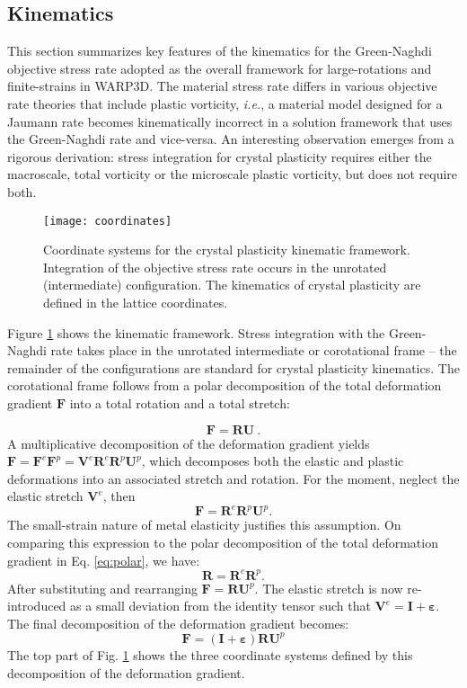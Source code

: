 \documentclass[11pt]{report}
\numberwithin{equation}{section}
\newcommand{\ie}{\emph{i.e.},\xspace}
\begin{document}
\subsection{Kinematics}

This section summarizes key features of the kinematics for
the Green-Naghdi objective stress rate adopted as the overall framework 
for large-rotations and finite-strains in WARP3D. The material
stress rate differs in various  objective rate theories
that include plastic vorticity, \ie a material model designed for a
Jaumann rate becomes kinematically incorrect in a solution framework
that uses the Green-Naghdi rate and vice-versa. An interesting observation
emerges from a rigorous derivation: stress integration for crystal plasticity
requires either the macroscale, total vorticity or the microscale
plastic vorticity, but does not require both.

\begin{figure}
\begin{centering}
\texttt{[image: coordinates]}
\par\end{centering}

\caption{
\small 
Coordinate systems for the crystal plasticity kinematic framework.
Integration of the objective stress rate occurs in the unrotated (intermediate)
configuration. The kinematics of crystal plasticity are defined in
the lattice coordinates. \label{fig:coords}
\normalsize}
\end{figure}


Figure \ref{fig:coords} shows the kinematic framework. Stress integration
with the Green-Naghdi rate takes place in the unrotated intermediate
or corotational frame -- the remainder of the configurations are standard
for crystal plasticity kinematics. The corotational frame
follows from a polar decomposition of the total deformation gradient
$\mathbf{F}$ into a total rotation and a total stretch:

\begin{equation}
\mathbf{F}=\mathbf{R}\mathbf{U}\ .\label{eq:polar}
\end{equation}
A multiplicative decomposition of the deformation gradient yields
$\ensuremath{\mathbf{F}=\mathbf{F}^{e}\mathbf{F}^{p}=\mathbf{V}^{e}
\mathbf{R}^{e}\mathbf{R}^{p}\mathbf{U}^{p}}$,
which decomposes both the elastic and plastic deformations into an
associated stretch and rotation. For the moment, neglect the elastic
stretch $\mathbf{V}^{e}$, then
\[
\ensuremath{\mathbf{F}=\mathbf{R}^{e}\mathbf{R}^{p}\mathbf{U}^{p}.}
\]
The small-strain nature of metal elasticity justifies this assumption.
On comparing this expression to the polar decomposition of the total
deformation gradient in Eq. \ref{eq:polar}, we have:
\[
\mathbf{R}=\mathbf{R}^{e}\mathbf{R}^{p}.
\]
After substituting and rearranging $\mathbf{F}=\mathbf{R}\mathbf{U}^{p}$.
The elastic stretch is now re-introduced as a small deviation from
the identity tensor such that $\mathbf{V}^{e}=\mathbf{I}+\bm{\varepsilon}$.
The final decomposition of the deformation gradient becomes:
\[
\mathbf{F}=\left(\mathbf{I}+\bm{\varepsilon}\right)\mathbf{R}\mathbf{U}^{p}
\]
The top part of Fig. \ref{fig:coords} shows the three coordinate
systems defined by this decomposition of the deformation gradient.
\end{document}
